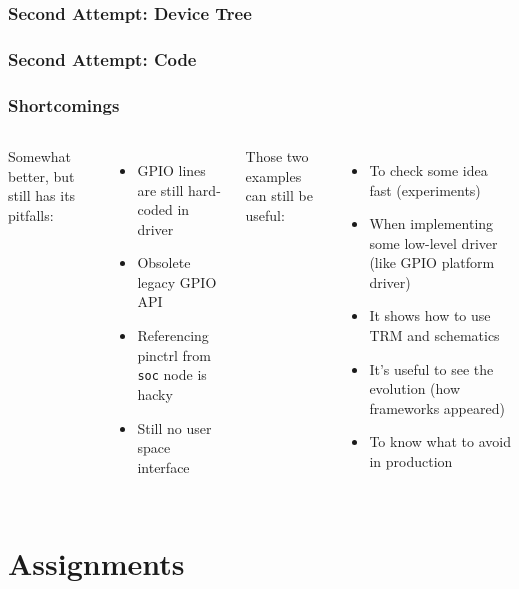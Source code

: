 \begin{frame}[containsverbatim]
  \frametitle{Second Attempt: Device Tree}
  
\end{frame}

\begin{frame}[containsverbatim,allowframebreaks=1]
  \frametitle{Second Attempt: Code}
  
\end{frame}

\begin{frame}
  \frametitle{Shortcomings}
  \begin{columns}
      Somewhat better, but still has its pitfalls:
      \begin{itemize}
        \item GPIO lines are still hard-coded in driver
        \item Obsolete legacy GPIO API
        \item Referencing pinctrl from \texttt{soc} node is hacky
        \item Still no user space interface
      \end{itemize}
      Those two examples can still be useful:
      \begin{itemize}
        \item To check some idea fast (experiments)
        \item When implementing some low-level driver (like GPIO platform
              driver)
        \item It shows how to use TRM and schematics
        \item It's useful to see the evolution (how frameworks appeared)
        \item To know what to avoid in production
      \end{itemize}
  \end{columns}
\end{frame}

\section{Assignments}


